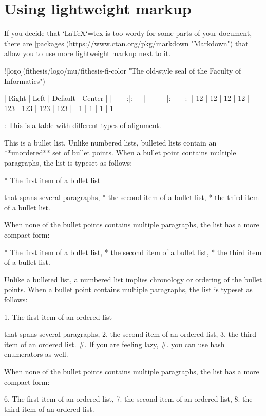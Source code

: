\documentclass[
  digital,     %
  oneside,     %
  nosansbold,  %
  nocolorbold, %
  lof,         %
  lot,         %
]{fithesis4}
\begin{document}
\chapter{Using lightweight markup}
\begin{markdown}

If you decide that `\LaTeX`{=tex} is too wordy for some parts of your
document, there are [packages](https://www.ctan.org/pkg/markdown
"Markdown") that allow you to use more lightweight markup next
to it.

 ![logo](fithesis/logo/mu/fithesis-fi-color "The old-style seal of
         the Faculty of Informatics")

| Right | Left | Default | Center |
|------:|:-----|---------|:------:|
|    12 | 12   | 12      |   12   |
|   123 | 123  | 123     |   123  |
|     1 | 1    | 1       |    1   |

: This is a table with different types of alignment.

This is a bullet list. Unlike numbered lists, bulleted lists
contain an **unordered** set of bullet points. When a bullet point
contains multiple paragraphs, the list is typeset as follows:

  * The first item of a bullet list

    that spans several paragraphs,
  * the second item of a bullet list,
  * the third item of a bullet list.

When none of the bullet points contains multiple paragraphs, the
list has a more compact form:

  * The first item of a bullet list,
  * the second item of a bullet list,
  * the third item of a bullet list.

Unlike a bulleted list, a numbered list implies chronology or
ordering of the bullet points. When a bullet point
contains multiple paragraphs, the list is typeset as follows:

  1. The first item of an ordered list

     that spans several paragraphs,
  2. the second item of an ordered list,
  3. the third item of an ordered list.
  #. If you are feeling lazy,
  #. you can use hash enumerators as well.

When none of the bullet points contains multiple paragraphs, the
list has a more compact form:

  6. The first item of an ordered list,
  7. the second item of an ordered list,
  8. the third item of an ordered list.


\end{markdown}
\end{document}
